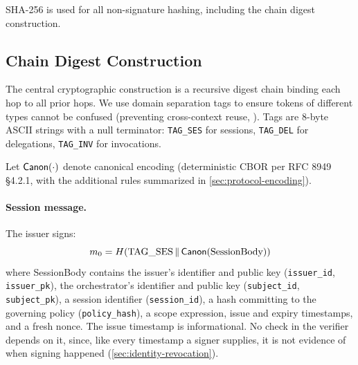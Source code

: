 \documentclass[11pt,a4paper]{article}
\begin{document}
SHA-256 is used for all non-signature hashing, including the chain
digest construction.

\subsection{Chain Digest Construction}
\label{sec:protocol-digest}

The central cryptographic construction is a recursive digest chain
binding each hop to all prior hops. We use domain separation tags to
ensure tokens of different types cannot be confused (preventing
cross-context reuse, ). Tags are 8-byte ASCII strings with a
null terminator: \texttt{TAG\_SES} for sessions, \texttt{TAG\_DEL} for
delegations, \texttt{TAG\_INV} for invocations.

Let $\mathsf{Canon}(\cdot)$ denote canonical encoding (deterministic CBOR per
RFC 8949 §4.2.1, with the additional rules summarized in
\cref{sec:protocol-encoding}).

\paragraph{Session message.}
The issuer signs:
\begin{equation}
m_0 = H(\text{TAG\_SES} \,\|\, \mathsf{Canon}(\text{SessionBody}))
\end{equation}
where SessionBody contains the issuer's identifier and public key
(\texttt{issuer\_id}, \texttt{issuer\_pk}), the orchestrator's identifier and public key
(\texttt{subject\_id}, \texttt{subject\_pk}), a session identifier
(\texttt{session\_id}), a
hash committing to the governing policy (\texttt{policy\_hash}), a
scope expression, issue and expiry timestamps, and a fresh nonce. The
issue timestamp is informational. No check in the verifier depends on
it, since, like every timestamp a signer supplies, it is not evidence of
when signing happened (\cref{sec:identity-revocation}).
\end{document}
